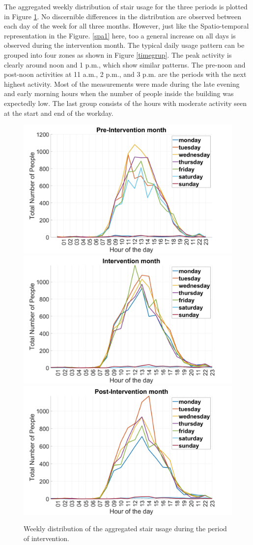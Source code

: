 \documentclass[../UNBThesis2.tex]{subfiles}
\begin{document}
The aggregated weekly distribution of stair usage for the three periods is plotted in Figure \ref{spa2}. No discernible differences in the distribution are observed between each day of the week for all three months. However, just like the Spatio-temporal representation in the Figure. \ref{spa1} here, too a general increase on all days is observed during the intervention month. The typical daily usage pattern can be grouped into four zones as shown in Figure \ref{timegrup}. The peak activity is clearly around noon and 1 p.m., which show similar patterns. The pre-noon and post-noon activities at 11 a.m., 2 p.m., and 3 p.m. are the periods with the next highest activity. Most of the measurements were made during the late evening and early morning hours when the number of people inside the building was expectedly low. The last group consists of the hours with moderate activity seen at the start and end of the workday. 



\begin{figure}[htbp]
    \includegraphics[width=.5\textwidth]{image/aggWeekPre.jpg}\hfill
    \includegraphics[width=.5\textwidth]{image/aggWeekInt.jpg}\hfill\centering
    \includegraphics[width=.5\textwidth]{image/aggWeekPost.jpg}
    \\[\smallskipamount]
    \caption{Weekly distribution of the aggregated stair usage during the period of intervention.}
    \label{spa2}
\end{figure}
\end{document}
